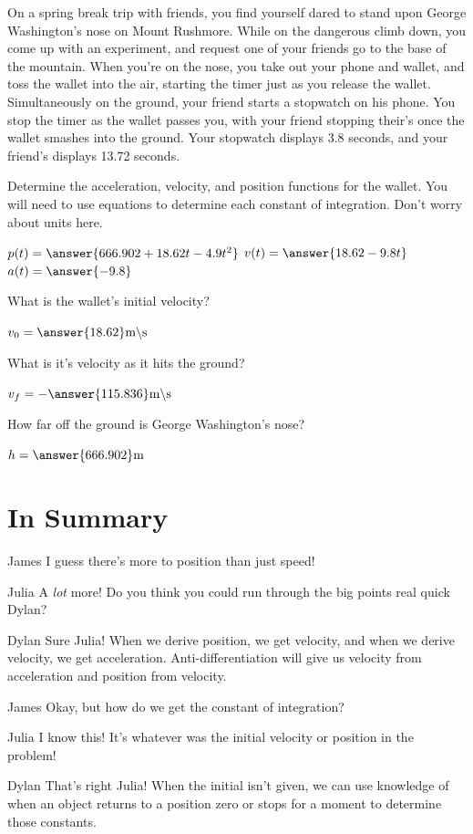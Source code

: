 \documentclass{ximera}
\begin{document}
\begin{question}
On a spring break trip with friends, you find yourself dared to stand upon George Washington's nose on Mount Rushmore. While on the dangerous climb down, you come up with an experiment, and request one of your friends go to the base of the mountain. When you're on the nose, you take out your phone and wallet, and toss the wallet into the air, starting the timer just as you release the wallet. Simultaneously on the ground, your friend starts a stopwatch on his phone. You stop the timer as the wallet passes you, with your friend stopping their's once the wallet smashes into the ground. Your stopwatch displays 3.8 seconds, and your friend's displays 13.72 seconds.

Determine the acceleration, velocity, and position functions for the wallet. You will need to use equations to determine each constant of integration. Don't worry about units here.

$p(t) = \answer{666.902+18.62t-4.9t^2}$
$v(t) = \answer{18.62-9.8t}$
$a(t) = \answer{-9.8}$

What is the wallet's initial velocity?

$v_0 = \answer{18.62} \text{m} \backslash \text{s}$

What is it's velocity as it hits the ground?

$v_f = -\answer{115.836} \text{m} \backslash \text{s}$

How far off the ground is George Washington's nose?

$h = \answer{666.902} \text{m}$
\end{question}

\section{In Summary}
\begin{dialogue}
\item[James] I guess there's more to position than just speed!
\item[Julia] A \textit{lot} more! Do you think you could run through the big points real quick Dylan?
\item[Dylan] Sure Julia! When we derive position, we get velocity, and when we derive velocity, we get acceleration. Anti-differentiation will give us velocity from acceleration and position from velocity.
\item[James] Okay, but how do we get the constant of integration?
\item[Julia] I know this! It's whatever was the initial velocity or position in the problem!
\item[Dylan] That's right Julia! When the initial isn't given, we can use knowledge of when an object returns to a position zero or stops for a moment to determine those constants.
\end{dialogue}
\end{document}
